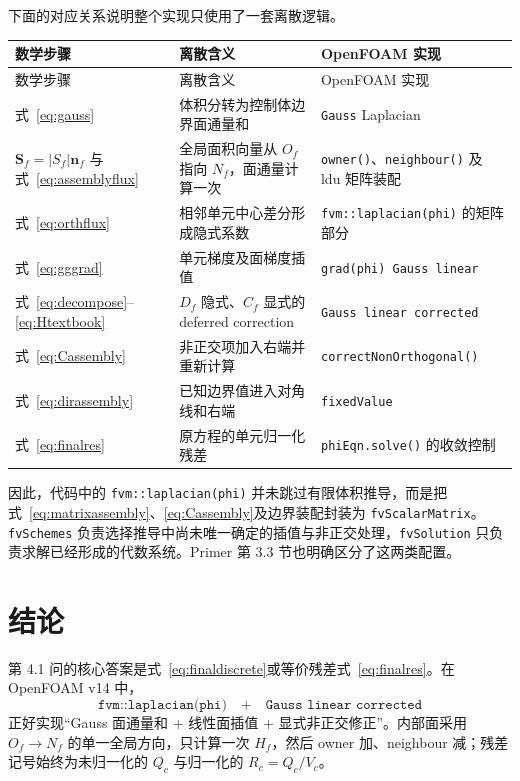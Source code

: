 \documentclass[UTF8,a4paper,11pt]{ctexart}
\newcommand{\vect}[1]{\bm{#1}}
\newcommand{\Sf}{\vect S_f}
\newcommand{\nf}{\vect n_f}
\begin{document}
下面的对应关系说明整个实现只使用了一套离散逻辑。
\begin{longtable}{p{}p{}p{}}
\toprule
数学步骤 & 离散含义 & OpenFOAM 实现\\
\midrule
\endfirsthead
\toprule
数学步骤 & 离散含义 & OpenFOAM 实现\\
\midrule
\endhead
式~\eqref{eq:gauss} & 体积分转为控制体边界面通量和 & \texttt{Gauss} Laplacian\\
\(\Sf=|S_f|\nf\) 与式~\eqref{eq:assemblyflux} & 全局面积向量从 \(O_f\) 指向 \(N_f\)，面通量计算一次 & \texttt{owner()}、\texttt{neighbour()} 及 ldu 矩阵装配\\
式~\eqref{eq:orthflux} & 相邻单元中心差分形成隐式系数 & \texttt{fvm::laplacian(phi)} 的矩阵部分\\
式~\eqref{eq:gggrad} & 单元梯度及面梯度插值 & \texttt{grad(phi) Gauss linear}\\
式~\eqref{eq:decompose}--\eqref{eq:Htextbook} & \(D_f\) 隐式、\(C_f\) 显式的 deferred correction & \texttt{Gauss linear corrected}\\
式~\eqref{eq:Cassembly} & 非正交项加入右端并重新计算 & \texttt{correctNonOrthogonal()}\\
式~\eqref{eq:dirassembly} & 已知边界值进入对角线和右端 & \texttt{fixedValue}\\
式~\eqref{eq:finalres} & 原方程的单元归一化残差 & \texttt{phiEqn.solve()} 的收敛控制\\
\bottomrule
\end{longtable}

因此，代码中的 \texttt{fvm::laplacian(phi)} 并未跳过有限体积推导，而是把式~\eqref{eq:matrixassembly}、\eqref{eq:Cassembly}及边界装配封装为 \texttt{fvScalarMatrix}。\texttt{fvSchemes} 负责选择推导中尚未唯一确定的插值与非正交处理，\texttt{fvSolution} 只负责求解已经形成的代数系统。Primer 第 3.3 节也明确区分了这两类配置\cite[第 3.3 节，第 117--131 页]{OFPrimer}。

\section{结论}

第 4.1 问的核心答案是式~\eqref{eq:finaldiscrete}或等价残差式~\eqref{eq:finalres}。在 OpenFOAM v14 中，
\begin{equation*}
  \texttt{fvm::laplacian(phi)}
  \quad+\quad
  \texttt{Gauss linear corrected}
\end{equation*}
正好实现“Gauss 面通量和 + 线性面插值 + 显式非正交修正”。内部面采用 \(O_f\to N_f\) 的单一全局方向，只计算一次 \(H_f\)，然后 owner 加、neighbour 减；残差记号始终为未归一化的 \(Q_c\) 与归一化的 \(R_c=Q_c/V_c\)。
\end{document}
